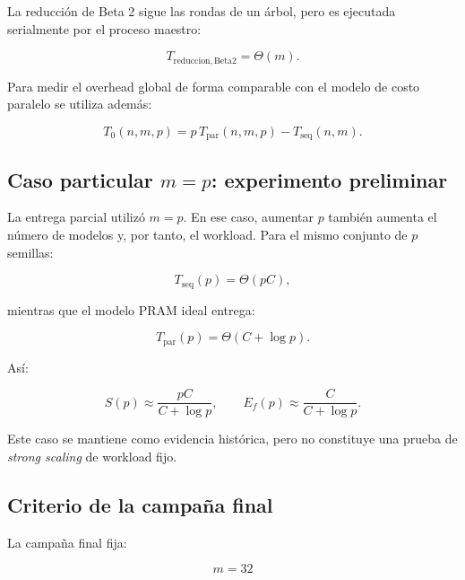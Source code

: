\documentclass[11pt,a4paper]{article}
\newcommand{\Speedup}{S}
\newcommand{\Efficiency}{E_f}
\newcommand{\Cost}{C}
\begin{document}
La reducción de Beta 2 sigue las rondas de un árbol, pero es ejecutada serialmente por
el proceso maestro:

\begin{equation}
    T_{\mathrm{reduccion,Beta2}}=\Theta(m).
\end{equation}

Para medir el overhead global de forma comparable con el modelo de costo paralelo se
utiliza además:

\begin{equation}
    T_0(n,m,p)
    =
    p\,T_{\mathrm{par}}(n,m,p)
    -
    T_{\mathrm{seq}}(n,m).
    \label{eq:overhead-exp}
\end{equation}

\subsection{Caso particular $m=p$: experimento preliminar}

La entrega parcial utilizó $m=p$. En ese caso, aumentar $p$ también aumenta el número
de modelos y, por tanto, el workload. Para el mismo conjunto de $p$ semillas:

\begin{equation}
    T_{\mathrm{seq}}(p)=\Theta(p\Cost),
\end{equation}

mientras que el modelo PRAM ideal entrega:

\begin{equation}
    T_{\mathrm{par}}(p)
    =
    \Theta(\Cost+\log p).
\end{equation}

Así:

\begin{equation}
    \Speedup(p)
    \approx
    \frac{p\Cost}{\Cost+\log p},
    \qquad
    \Efficiency(p)
    \approx
    \frac{\Cost}{\Cost+\log p}.
\end{equation}

Este caso se mantiene como evidencia histórica, pero no constituye una prueba de
\emph{strong scaling} de workload fijo.

\subsection{Criterio de la campaña final}

La campaña final fija:

\begin{equation}
    m=32
\end{equation}
\end{document}
